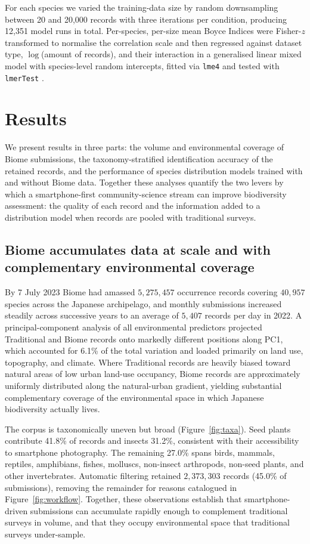 \documentclass[11pt]{article}
\begin{document}
For each species we varied the training-data size by random downsampling between 20 and 20{,}000 records with three iterations per condition, producing 12{,}351 model runs in total. Per-species, per-size mean Boyce Indices were Fisher-$z$ transformed to normalise the correlation scale and then regressed against dataset type, $\log$(amount of records), and their interaction in a generalised linear mixed model with species-level random intercepts, fitted via \texttt{lme4} \citep{bates2015lme4} and tested with \texttt{lmerTest} \citep{kuznetsova2017lmertest}.

\section{Results}

We present results in three parts: the volume and environmental coverage of Biome submissions, the taxonomy-stratified identification accuracy of the retained records, and the performance of species distribution models trained with and without Biome data. Together these analyses quantify the two levers by which a smartphone-first community-science stream can improve biodiversity assessment: the quality of each record and the information added to a distribution model when records are pooled with traditional surveys.

\subsection{Biome accumulates data at scale and with complementary environmental coverage}

By 7 July 2023 Biome had amassed $5{,}275{,}457$ occurrence records covering $40{,}957$ species across the Japanese archipelago, and monthly submissions increased steadily across successive years to an average of $5{,}407$ records per day in 2022. A principal-component analysis of all environmental predictors projected Traditional and Biome records onto markedly different positions along PC1, which accounted for 6.1\% of the total variation and loaded primarily on land use, topography, and climate. Where Traditional records are heavily biased toward natural areas of low urban land-use occupancy, Biome records are approximately uniformly distributed along the natural-urban gradient, yielding substantial complementary coverage of the environmental space in which Japanese biodiversity actually lives.

The corpus is taxonomically uneven but broad (Figure~\ref{fig:taxa}). Seed plants contribute 41.8\% of records and insects 31.2\%, consistent with their accessibility to smartphone photography. The remaining 27.0\% spans birds, mammals, reptiles, amphibians, fishes, molluscs, non-insect arthropods, non-seed plants, and other invertebrates. Automatic filtering retained $2{,}373{,}303$ records (45.0\% of submissions), removing the remainder for reasons catalogued in Figure~\ref{fig:workflow}. Together, these observations establish that smartphone-driven submissions can accumulate rapidly enough to complement traditional surveys in volume, and that they occupy environmental space that traditional surveys under-sample.
\end{document}
